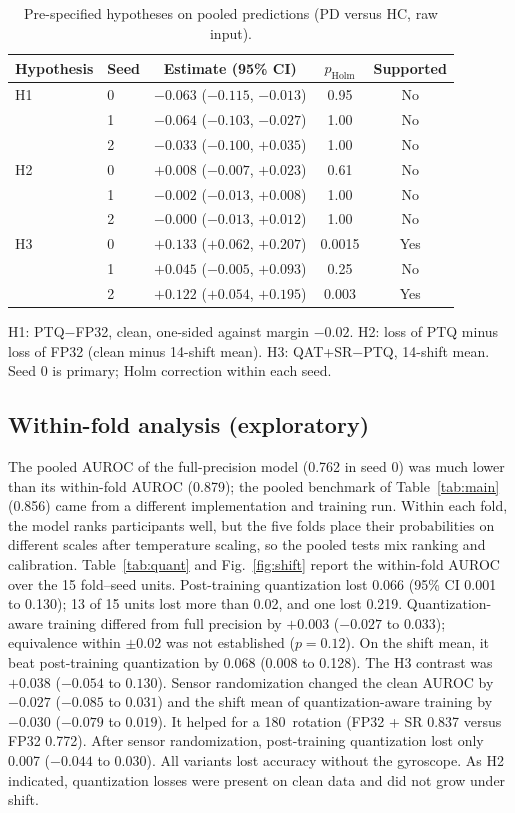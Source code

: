 \documentclass[preprint,12pt]{elsarticle}
\begin{document}
\begin{table}[!t]
\caption{Pre-specified hypotheses on pooled predictions (PD versus HC, raw input).}
\label{tab:hyp}
\centering\small
\begin{tabular}{@{}llccc@{}}
\toprule
Hypothesis & Seed & Estimate (95\% CI) & $p_\text{Holm}$ & Supported \\
\midrule
H1 & 0 & $-0.063$ ($-0.115$, $-0.013$) & 0.95 & No \\
 & 1 & $-0.064$ ($-0.103$, $-0.027$) & 1.00 & No \\
 & 2 & $-0.033$ ($-0.100$, $+0.035$) & 1.00 & No \\
H2 & 0 & $+0.008$ ($-0.007$, $+0.023$) & 0.61 & No \\
 & 1 & $-0.002$ ($-0.013$, $+0.008$) & 1.00 & No \\
 & 2 & $-0.000$ ($-0.013$, $+0.012$) & 1.00 & No \\
H3 & 0 & $+0.133$ ($+0.062$, $+0.207$) & 0.0015 & Yes \\
 & 1 & $+0.045$ ($-0.005$, $+0.093$) & 0.25 & No \\
 & 2 & $+0.122$ ($+0.054$, $+0.195$) & 0.003 & Yes \\
\bottomrule
\end{tabular}

\vspace{2pt}\parbox{\linewidth}{\footnotesize H1: PTQ$-$FP32, clean, one-sided against margin $-0.02$. H2: loss of PTQ minus loss of FP32 (clean minus 14-shift mean). H3: QAT+SR$-$PTQ, 14-shift mean. Seed 0 is primary; Holm correction within each seed.}
\end{table}

\subsection{Within-fold analysis (exploratory)}
The pooled AUROC of the full-precision model (0.762 in seed 0) was much lower than its within-fold AUROC (0.879); the pooled benchmark of Table~\ref{tab:main} (0.856) came from a different implementation and training run. Within each fold, the model ranks participants well, but the five folds place their probabilities on different scales after temperature scaling, so the pooled tests mix ranking and calibration. Table~\ref{tab:quant} and Fig.~\ref{fig:shift} report the within-fold AUROC over the 15 fold--seed units. Post-training quantization lost 0.066 (95\% CI 0.001 to 0.130); 13 of 15 units lost more than 0.02, and one lost 0.219. Quantization-aware training differed from full precision by $+0.003$ ($-0.027$ to $0.033$); equivalence within $\pm0.02$ was not established ($p=0.12$). On the shift mean, it beat post-training quantization by 0.068 (0.008 to 0.128). The H3 contrast was $+0.038$ ($-0.054$ to $0.130$). Sensor randomization changed the clean AUROC by $-0.027$ ($-0.085$ to $0.031$) and the shift mean of quantization-aware training by $-0.030$ ($-0.079$ to $0.019$). It helped for a 180\textdegree\ rotation (FP32 + SR 0.837 versus FP32 0.772). After sensor randomization, post-training quantization lost only 0.007 ($-0.044$ to $0.030$). All variants lost accuracy without the gyroscope. As H2 indicated, quantization losses were present on clean data and did not grow under shift.
\end{document}
